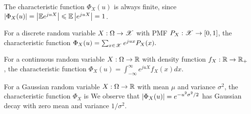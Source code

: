 \documentclass[letterpaper,10pt,english]{article}
\begin{document}
\begin{rem}
The characteristic function $\Phi_X(u)$ is always finite, 
since $\left\lvert\Phi_X(u)\right\rvert = \left\lvert\mathbb{E} e^{ju X}\right\rvert \leqslant \mathbb{E}\left\lvert e^{ju X}\right\rvert = 1$. 
\end{rem} 
\begin{rem}
For a discrete random variable $X: \Omega \to \mathscr{X}$ with PMF $P_X:\mathscr{X}\to [0,1]$, 
the characteristic function $\Phi_X(u) %
= \sum_{x \in \sX}e^{ju x}P_X(x).$
\end{rem} 
\begin{rem}
For a continuous random variable $X: \Omega \to \mathbb{R}$ with density function $f_X: \mathbb{R} \to \mathbb{R}_+$, 
the characteristic function $\Phi_X(u) = \int_{-\infty}^{\infty}e^{ju X}f_X(x)dx.$
\end{rem} 
\begin{shaded}
\begin{exmp} 
For a Gaussian random variable $X: \Omega \to \mathbb{R}$ with mean $\mu$ and variance $\sigma^2$, 
the characteristic function $\Phi_X$ is 
We observe that $\left\lvert\Phi_X(u)\right\rvert = e^{-u^2\sigma^2/2}$ has Gaussian decay with zero mean and variance $1/\sigma^2$. 
\end{exmp}
\end{shaded}
\end{document}
